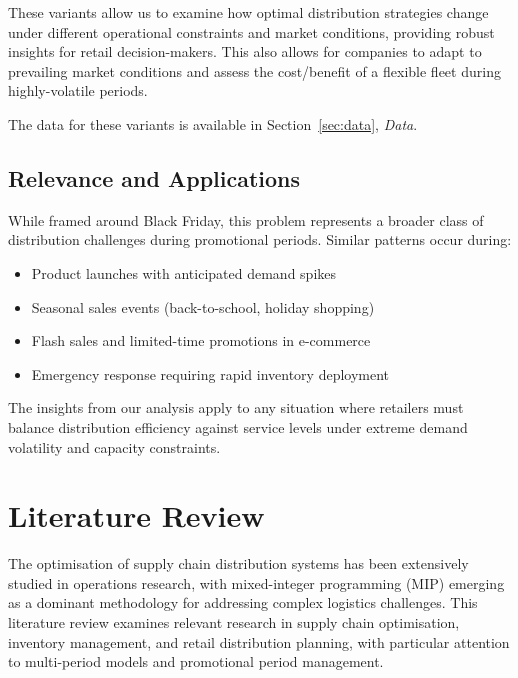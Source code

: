 \documentclass[a4paper,12pt]{article}
\begin{document}
These variants allow us to examine how optimal distribution strategies change under different operational constraints and market conditions, providing robust insights for retail decision-makers.
This also allows for companies to adapt to prevailing market conditions and assess the cost/benefit of a flexible fleet during highly-volatile periods.

The data for these variants is available in Section~\ref{sec:data}, \textit{Data}.

\subsection{Relevance and Applications}\label{subsec:relevance-and-applications}

While framed around Black Friday, this problem represents a broader class of distribution challenges during promotional periods.
Similar patterns occur during:
\begin{itemize}
    \item Product launches with anticipated demand spikes
    \item Seasonal sales events (back-to-school, holiday shopping)
    \item Flash sales and limited-time promotions in e-commerce
    \item Emergency response requiring rapid inventory deployment
\end{itemize}

The insights from our analysis apply to any situation where retailers must balance distribution efficiency against service levels under extreme demand volatility and capacity constraints.







\section{Literature Review}\label{sec:literature-review}

The optimisation of supply chain distribution systems has been extensively studied in operations research, with mixed-integer programming (MIP) emerging as a dominant methodology for addressing complex logistics challenges.
This literature review examines relevant research in supply chain optimisation, inventory management, and retail distribution planning, with particular attention to multi-period models and promotional period management.
\end{document}
